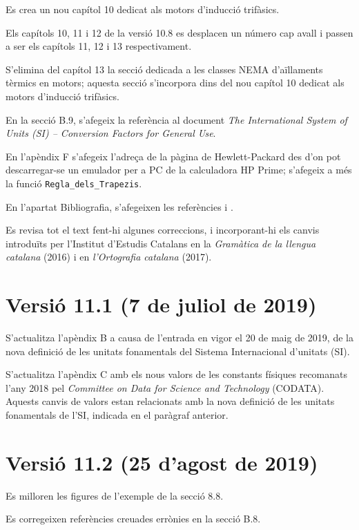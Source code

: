 Es crea un nou capítol 10 dedicat als motors d'inducció trifàsics.

Els capítols 10, 11 i 12 de la versió 10.8 es desplacen un número cap
avall i passen a ser els capítols 11, 12 i 13 respectivament.

S'elimina del capítol 13 la secció dedicada a les classes NEMA d’aïllaments tèrmics en motors; aquesta secció s'incorpora dins del nou capítol 10 dedicat als motors d'inducció trifàsics.

En la secció B.9, s'afegeix la referència al document \textit{The International System of Units (SI) – Conversion Factors for General Use}.

En l'apèndix F s'afegeix l'adreça de la pàgina de Hewlett-Packard des d'on pot descarregar-se un emulador per a PC de la calculadora \textsf{HP Prime}; s'afegeix a més la funció \texttt{Regla\_dels\_Trapezis}.

En l’apartat Bibliografia, s’afegeixen les referències  \cite{JFM} i \cite{WES}.

Es revisa tot el text fent-hi algunes correccions,  i incorporant-hi els canvis introduïts per l’Institut d’Estudis Catalans en la \emph{Gramàtica de la llengua catalana}
(2016) i en \emph{l’Ortografia catalana} (2017).


\section*{Versió 11.1 (7 de juliol de 2019)}

S'actualitza l'apèndix B a causa de l'entrada en vigor el 20 de maig de 2019, de la nova definició de les unitats fonamentals del Sistema Internacional d'unitats (SI).

S'actualitza l'apèndix  C amb els nous valors de les constants físiques recomanats l'any 2018 pel \textit{Committee on Data for Science and Technology} (CODATA). Aquests canvis de  valors estan  relacionats amb la nova definició de les unitats fonamentals de l'SI, indicada en el paràgraf anterior.

\section*{Versió 11.2 (25 d'agost de 2019)}

Es milloren les figures de l'exemple de la secció 8.8.

Es corregeixen referències creuades errònies en la secció B.8.

